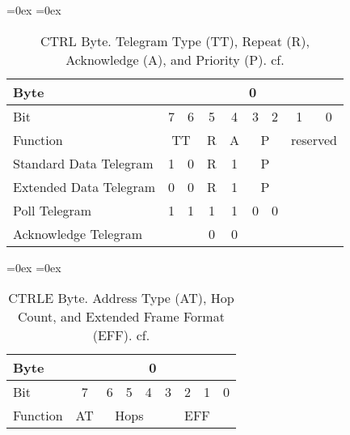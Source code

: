 		\begin{table}
			\aboverulesep=0ex
			\belowrulesep=0ex
			\renewcommand{\arraystretch}{1.2}
			
			\centering
			\begin{tabular}{|l|c|c|c|c|c|c|c|c|}
				\toprule
				Byte & \multicolumn{8}{c|}{0} \\\midrule
				Bit & 7 & 6 & 5 & 4 & 3 & 2 & 1 & 0 \\\midrule
				Function & \multicolumn{2}{c|}{TT} & R & A & \multicolumn{2}{c|}{P} & \multicolumn{2}{c|}{reserved} \\\bottomrule \toprule
				Standard Data Telegram & 1 & 0 & R & 1 & \multicolumn{2}{c|}{P} & \multicolumn{2}{c|}{ } \\\midrule
				Extended Data Telegram & 0 & 0 & R & 1 & \multicolumn{2}{c|}{P} & \multicolumn{2}{c|}{ } \\\midrule
				Poll Telegram & 1 & 1 & 1 & 1 & 0 & 0 & \multicolumn{2}{c|}{ } \\\midrule
				Acknowledge Telegram & \multicolumn{2}{c|}{ } & 0 &0 & \multicolumn{2}{c|}{ } & \multicolumn{2}{c|}{ } \\\bottomrule
			\end{tabular}
			\caption[\knx CTRL Byte]{\knx CTRL Byte. Telegram Type (TT), Repeat (R), Acknowledge (A), and Priority (P). cf. \textcite{Sokollik2017}}
			\label{tab:background:bas:knx:proto:ctrl}
		\end{table}
	
		\begin{table}
			\aboverulesep=0ex
			\belowrulesep=0ex
			\renewcommand{\arraystretch}{1.2}
			
			\centering
			\begin{tabular}{|l|c|c|c|c|c|c|c|c|}
				\toprule
				Byte & \multicolumn{8}{c|}{0} \\\midrule
				Bit & 7 & 6 & 5 & 4 & 3 & 2 & 1 & 0 \\\midrule
				Function & AT & \multicolumn{3}{c|}{Hops} & \multicolumn{4}{c|}{EFF} \\\bottomrule
			\end{tabular}
			\caption[\knx CTRLE Byte]{\knx CTRLE Byte. Address Type (AT), Hop Count, and Extended Frame Format (EFF). cf. \textcite{Sokollik2017}}
		\end{table}
	
